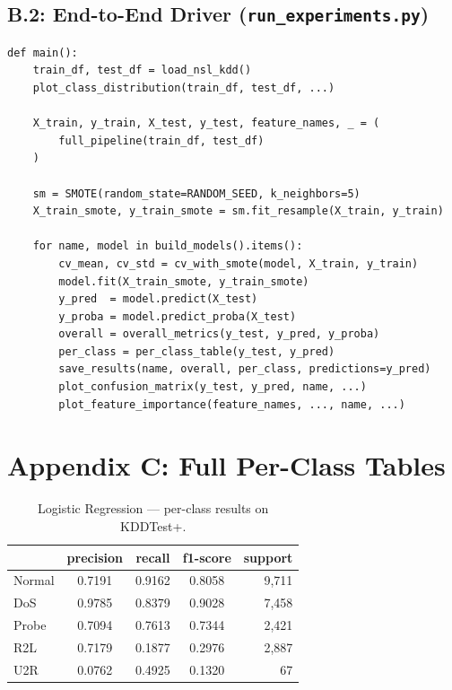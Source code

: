 \documentclass[11pt, a4paper]{article}
\begin{document}
\subsection*{B.2: End-to-End Driver (\texttt{run\_experiments.py})}
\begin{lstlisting}[caption={Main pipeline: load -> preprocess -> CV+SMOTE -> final fit -> test eval.}]
def main():
    train_df, test_df = load_nsl_kdd()
    plot_class_distribution(train_df, test_df, ...)

    X_train, y_train, X_test, y_test, feature_names, _ = (
        full_pipeline(train_df, test_df)
    )

    sm = SMOTE(random_state=RANDOM_SEED, k_neighbors=5)
    X_train_smote, y_train_smote = sm.fit_resample(X_train, y_train)

    for name, model in build_models().items():
        cv_mean, cv_std = cv_with_smote(model, X_train, y_train)
        model.fit(X_train_smote, y_train_smote)
        y_pred  = model.predict(X_test)
        y_proba = model.predict_proba(X_test)
        overall = overall_metrics(y_test, y_pred, y_proba)
        per_class = per_class_table(y_test, y_pred)
        save_results(name, overall, per_class, predictions=y_pred)
        plot_confusion_matrix(y_test, y_pred, name, ...)
        plot_feature_importance(feature_names, ..., name, ...)
\end{lstlisting}

\section*{Appendix C: Full Per-Class Tables}

\begin{table}[H]
\centering
\caption{Logistic Regression --- per-class results on KDDTest+.}
\begin{tabular}{lcccr}
\toprule
        & precision & recall & f1-score & support \\
\midrule
Normal  & 0.7191 & 0.9162 & 0.8058 & 9{,}711 \\
DoS     & 0.9785 & 0.8379 & 0.9028 & 7{,}458 \\
Probe   & 0.7094 & 0.7613 & 0.7344 & 2{,}421 \\
R2L     & 0.7179 & 0.1877 & 0.2976 & 2{,}887 \\
U2R     & 0.0762 & 0.4925 & 0.1320 &      67 \\
\bottomrule
\end{tabular}
\end{table}
\end{document}
